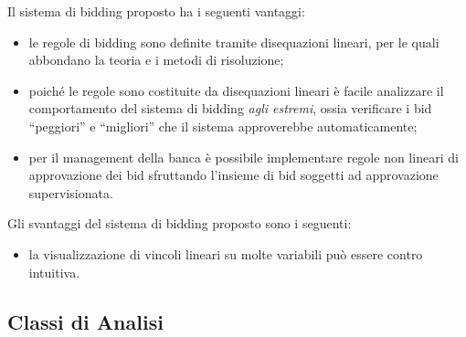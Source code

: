 Il sistema di bidding proposto ha i seguenti vantaggi:
\begin{itemize}
	\item le regole di bidding sono definite tramite disequazioni lineari, per le quali abbondano la teoria e i metodi di risoluzione;

	\item poiché le regole sono costituite da disequazioni lineari è facile analizzare il comportamento del sistema di bidding \emph{agli estremi}, ossia verificare i bid ``peggiori'' e ``migliori'' che il sistema approverebbe automaticamente;

	\item per il management della banca è possibile implementare regole non lineari di approvazione dei bid sfruttando l'insieme di bid soggetti ad approvazione supervisionata.
\end{itemize}

Gli svantaggi del sistema di bidding proposto sono i seguenti:
\begin{itemize}
	\item la visualizzazione di vincoli lineari su molte variabili può essere contro intuitiva.
\end{itemize}

\subsection{Classi di Analisi}
